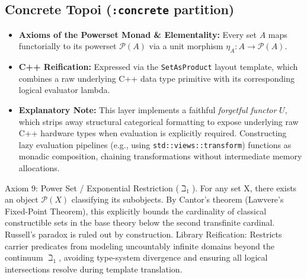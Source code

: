 \documentclass[11pt, a4paper]{article}
\begin{document}
\subsection{Concrete Topoi (\texttt{:concrete} partition)}
\begin{itemize}
    \item \textbf{Axioms of the Powerset Monad \& Elementality:} Every set $A$ maps functorially to its powerset $\mathcal{P}(A)$ via a unit morphism $\eta_A: A \to \mathcal{P}(A)$.
    \item \textbf{C++ Reification:} Expressed via the \texttt{SetAsProduct} layout template, which combines a raw underlying C++ data type primitive with its corresponding logical evaluator lambda.
    \item \textbf{Explanatory Note:} This layer implements a faithful \textit{forgetful functor} $U$, which strips away structural categorical formatting to expose underlying raw C++ hardware types when evaluation is explicitly required. Constructing lazy evaluation pipelines (e.g., using \texttt{std::views::transform}) functions as monadic composition, chaining transformations without intermediate memory allocations.
\end{itemize}
Axiom 9: Power Set / Exponential Restriction (\(\beth _{1}\)). For any set X, there exists an object \(\mathcal{P}(X)\) classifying its subobjects. By Cantor’s theorem (Lawvere’s Fixed-Point Theorem), this explicitly bounds the cardinality of classical constructible sets in the base theory below the second transfinite cardinal. Russell's paradox is ruled out by construction. Library Reification: Restricts carrier predicates from modeling uncountably infinite domains beyond the continuum \(\beth _{1}\), avoiding type-system divergence and ensuring all logical intersections resolve during template translation.
\end{document}
